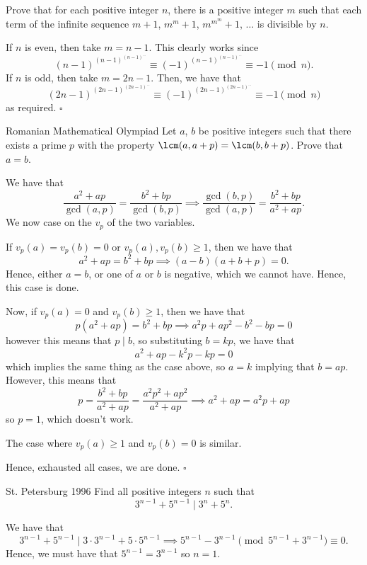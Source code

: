\documentclass{article}
\begin{document}
\begin{problem}[1.12.5]{}
Prove that for each positive integer $n$, there is a positive integer $m$ such that each term of the infinite sequence $m + 1$, $m^m + 1$, $m^{m^m} + 1$, $\dots$ is divisible by $n$. 
\end{problem}
If $n$ is even, then take $m = n-1$. This clearly works since \[(n-1)^{(n-1)^{(n-1)^{\dots}}} \equiv (-1)^{(n-1)^{(n-1)^{\dots}}} \equiv -1 \pmod{n}.\] If $n$ is odd, then take $m = 2n-1$. Then, we have that \[(2n-1)^{(2n-1)^{(2n-1)^{\dots}}} \equiv (-1)^{(2n-1)^{(2n-1)^{\dots}}} \equiv -1 \pmod{n}\] as required. $\square$

\begin{problem}[1.12.6]{Romanian Mathematical Olympiad}
Let $a$, $b$ be positive integers such that there exists a prime $p$ with the property $\lcm(a, a + p) = \lcm(b, b + p)$. Prove that $a = b$.
\end{problem}
We have that \[\dfrac{a^2+ap}{\gcd(a, p)} = \dfrac{b^2+bp}{\gcd(b, p)} \implies \dfrac{\gcd(b, p)}{\gcd(a, p)} = \dfrac{b^2+bp}{a^2+ap}.\] We now case on the $v_p$ of the two variables.

If $v_p(a) = v_p(b) = 0$ or $v_p(a), v_p(b) \ge 1$, then we have that \[a^2+ap = b^2+bp \implies (a-b)(a+b+p) = 0.\] Hence, either $a = b$, or one of $a$ or $b$ is negative, which we cannot have. Hence, this case is done.

Now, if $v_p(a) = 0$ and $v_p(b) \ge 1$, then we have that \[p(a^2+ap) = b^2+bp \implies a^2 p + a p^2 - b^2 - b p = 0\] however this means that $p \mid b$, so substituting $b = kp$, we have that \[a^2+ap-k^2p-kp = 0\] which implies the same thing as the case above, so $a = k$ implying that $b = ap$. However, this means that \[p = \dfrac{b^2+bp}{a^2+ap} = \dfrac{a^2p^2+ap^2}{a^2+ap} \implies a^2+ap = a^2p+ap\] so $p = 1$, which doesn't work.

The case where $v_p(a) \ge 1$ and $v_p(b) = 0$ is similar.

Hence, exhausted all cases, we are done. $\square$

\begin{problem}[1.12.7]{St. Petersburg 1996}
 Find all positive integers $n$ such that \[3^{n-1} + 5^{n-1} \mid 3^n + 5^n.\]
\end{problem}
We have that \[3^{n-1}+5^{n-1} \mid 3\cdot 3^{n-1}+5\cdot 5^{n-1} \implies 5^{n-1}-3^{n-1} \pmod{5^{n-1}+3^{n-1}} \equiv 0.\] Hence, we must have that $5^{n-1} = 3^{n-1}$ so $n = \boxed{1}$.
\end{document}
